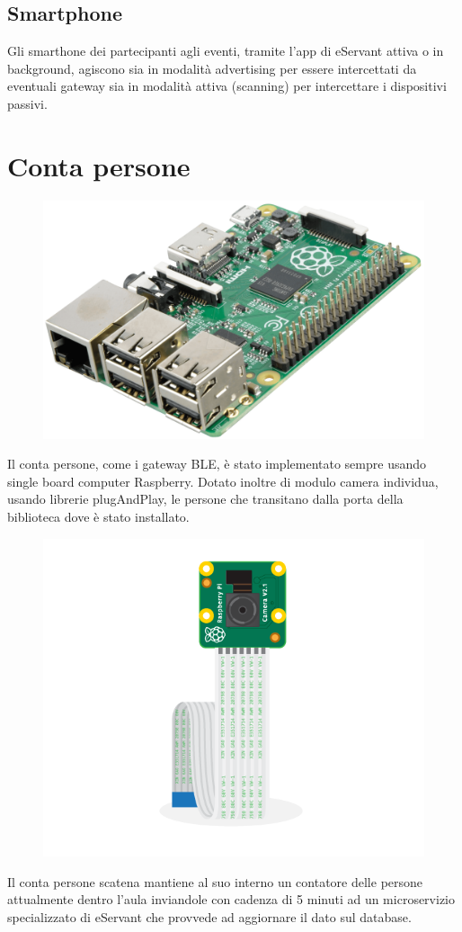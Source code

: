 \subsection{Smartphone}
Gli smarthone dei partecipanti agli eventi, tramite l'app di eServant attiva o in background, agiscono
sia in modalità advertising per essere intercettati da eventuali gateway sia in modalità attiva (scanning) per 
intercettare i dispositivi passivi.

\section{Conta persone}

\begin{figure}[H]
    \centering  
    \includegraphics[scale=0.2]{img/cap4/raspberry}
\end{figure}


Il conta persone, come i gateway BLE, è stato implementato sempre usando single board computer
Raspberry.
Dotato inoltre di modulo camera individua, usando librerie plugAndPlay, le persone che transitano 
dalla porta della biblioteca dove è stato installato.

\begin{figure}[H]
    \centering  
    \includegraphics[scale=0.2]{img/cap4/camera}
\end{figure}

Il conta persone scatena mantiene al suo interno un contatore delle persone attualmente dentro l'aula
inviandole con cadenza di 5 minuti ad un microservizio specializzato di eServant che provvede ad
aggiornare il dato sul database.